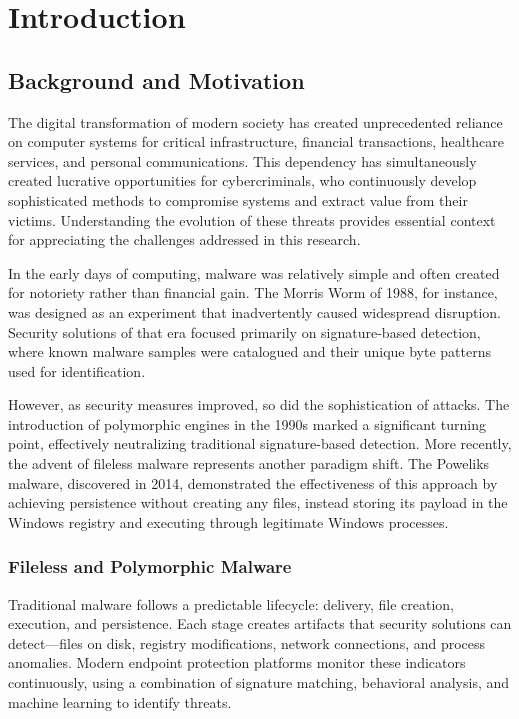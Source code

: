 \chapter{Introduction}
\label{ch:introduction}

\section{Background and Motivation}
\label{sec:background}

The digital transformation of modern society has created unprecedented reliance on computer systems for critical infrastructure, financial transactions, healthcare services, and personal communications. This dependency has simultaneously created lucrative opportunities for cybercriminals, who continuously develop sophisticated methods to compromise systems and extract value from their victims. Understanding the evolution of these threats provides essential context for appreciating the challenges addressed in this research.

In the early days of computing, malware was relatively simple and often created for notoriety rather than financial gain. The Morris Worm of 1988, for instance, was designed as an experiment that inadvertently caused widespread disruption. Security solutions of that era focused primarily on signature-based detection, where known malware samples were catalogued and their unique byte patterns used for identification.

However, as security measures improved, so did the sophistication of attacks. The introduction of polymorphic engines in the 1990s marked a significant turning point, effectively neutralizing traditional signature-based detection. More recently, the advent of fileless malware represents another paradigm shift. The Poweliks malware, discovered in 2014, demonstrated the effectiveness of this approach by achieving persistence without creating any files, instead storing its payload in the Windows registry and executing through legitimate Windows processes.

\subsection{Fileless and Polymorphic Malware}
\label{subsec:advanced_malware}

Traditional malware follows a predictable lifecycle: delivery, file creation, execution, and persistence. Each stage creates artifacts that security solutions can detect—files on disk, registry modifications, network connections, and process anomalies. Modern endpoint protection platforms monitor these indicators continuously, using a combination of signature matching, behavioral analysis, and machine learning to identify threats.

